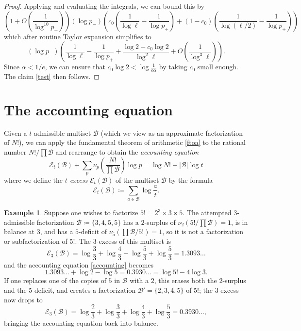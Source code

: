 \documentclass[10pt,a4paper,reqno]{amsart}
\numberwithin{equation}{section}
\theoremstyle{plain}
\theoremstyle{definition}
\newtheorem{example}[example]{Example}
\newcommand\tuple{{\mathcal B}}
\newcommand\excess{{\mathcal{E}}}
\begin{document}
\begin{proof}
Applying  and evaluating the integrals, we can bound this by
$$
\left( 1 + O\left(\frac{1}{\log^{10} p_-}\right)\right)
(\log p_-) \left( c_0 \left( \frac{1}{\log \ell} - \frac{1}{\log p_+} \right) + (1-c_0) \left( \frac{1}{\log(\ell/2)} - \frac{1}{\log p_+} \right) \right)$$
which after routine Taylor expansion simplifies to
$$ (\log p_-) \left(\frac{1}{\log \ell} - \frac{1}{\log p_+} + \frac{\log 2 - c_0 \log 2}{\log^2 \ell} + O\left( \frac{1}{\log^3 \ell}\right) \right).$$
Since $\alpha < 1/e$, we can ensure that $c_0 \log 2 < \log\frac{1}{e\alpha}$ by taking $c_0$ small enough.  The claim \eqref{test} then follows.
\end{proof}

\section{The accounting equation}\label{accounting-sec}

Given a $t$-admissible multiset $\tuple$ (which we view as an approximate factorization of $N!$), we can apply the fundamental theorem of arithmetic \eqref{ftoa} to the rational number  $N!/\prod \tuple$ and rearrange to obtain the \emph{accounting equation}
\begin{equation}\label{accounting}
  \excess_t(\tuple) + \sum_p \nu_p\left( \frac{N!}{\prod \tuple} \right) \log p = \log N! - |\tuple| \log t
\end{equation}
where we define the \emph{$t$-excess} $\excess_t(\tuple)$ of the multiset $\tuple$ by the formula
\begin{equation}\label{excess-def}
  \excess_t(\tuple) \coloneqq \sum_{a \in \tuple} \log \frac{a}{t}.
\end{equation}

\begin{example} Suppose one wishes to factorize $5! = 2^3 \times 3 \times 5$.  The attempted $3$-admissible factorization $\tuple \coloneqq \{3,4,5,5\}$ has a $2$-surplus of $\nu_2(5!/\prod \tuple) = 1$, is in balance at $3$, and has a $5$-deficit of $\nu_5(\prod \tuple/5!) = 1$, so it is not a factorization or subfactorization of $5!$.  The $3$-excess of this multiset is
  $$ \excess_3(\tuple) = \log \frac{3}{3} + \log \frac{4}{3} + \log \frac{5}{3} + \log \frac{5}{3} = 1.3093\dots$$
  and the accounting equation \eqref{accounting} becomes
  $$ 1.3093\dots + \log 2 - \log 5 = 0.3930\dots = \log 5! - 4 \log 3.$$
  If one replaces one of the copies of $5$ in ${\mathcal B}$ with a $2$, this erases both the $2$-surplus and the $5$-deficit, and creates a factorization $\tuple' = \{2,3,4,5\}$ of $5!$; the $3$-excess now drops to
  $$ \excess_3(\tuple) = \log \frac{2}{3} + \log \frac{3}{3} + \log \frac{4}{3} + \log \frac{5}{3}  = 0.3930\dots,$$
  bringing the accounting equation back into balance.
\end{example}
\end{document}
